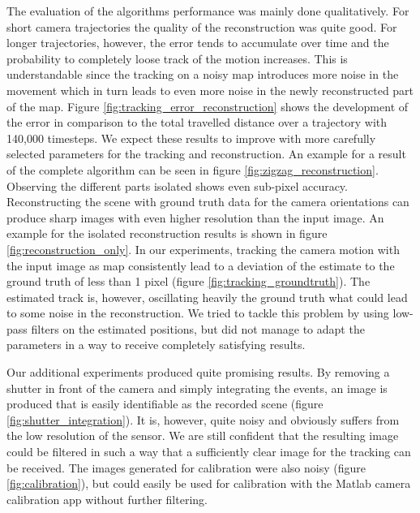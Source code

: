 The evaluation of the algorithms performance was mainly done qualitatively.
For short camera trajectories the quality of the reconstruction was quite good.
For longer trajectories, however, the error tends to accumulate over time and the
probability to completely loose track of the motion increases.
This is understandable since the tracking on a noisy map introduces more noise
in the movement which in turn leads to even more noise in the newly reconstructed
part of the map.
Figure \ref{fig:tracking_error_reconstruction} shows the development of the error
in comparison to the total travelled distance over a trajectory with 140,000 timesteps.
We expect these results to improve with more carefully selected parameters for the
tracking and reconstruction.
An example for a result of the complete algorithm can be seen in figure \ref{fig:zigzag_reconstruction}.
Observing the different parts isolated shows even sub-pixel accuracy.
Reconstructing the scene with ground truth data for the camera orientations can produce sharp images
with even higher resolution than the input image. An example for the isolated reconstruction results
is shown in figure \ref{fig:reconstruction_only}.
In our experiments, tracking the camera motion with the input image as map consistently lead to a deviation
of the estimate to the ground truth of less than 1 pixel (figure \ref{fig:tracking_groundtruth}). The estimated track is, however, oscillating heavily
the ground truth what could lead to some noise in the reconstruction. We tried to tackle
this problem by using low-pass filters on the estimated positions, but did not manage to
adapt the parameters in a way to receive completely satisfying results.

Our additional experiments produced quite promising results.
By removing a shutter in front of the camera and simply integrating the events,
an image is produced that is easily identifiable as the recorded scene (figure \ref{fig:shutter_integration}).
It is, however, quite noisy and obviously suffers from the low resolution of the sensor.
We are still confident that the resulting image could be filtered in such a way that
a sufficiently clear image for the tracking can be received.
The images generated for calibration were also noisy (figure \ref{fig:calibration}), but could easily be used
for calibration with the Matlab camera calibration app without further filtering.

